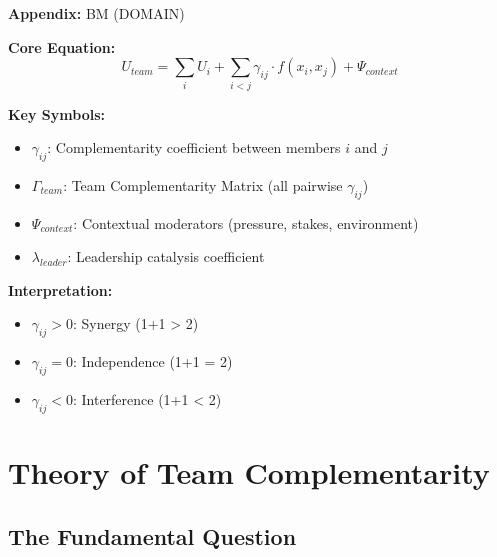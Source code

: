 
\begin{tcolorbox}[colback=blue!5!white, colframe=blue!75!black, title=Quick Reference: Team Complementarity]
\textbf{Appendix:} BM (DOMAIN)


\textbf{Core Equation:}
\begin{equation}
U_{team} = \sum_{i} U_i + \sum_{i<j} \gamma_{ij} \cdot f(x_i, x_j) + \Psi_{context}
\end{equation}

\textbf{Key Symbols:}
\begin{itemize}
    \item $\gamma_{ij}$: Complementarity coefficient between members $i$ and $j$
    \item $\Gamma_{team}$: Team Complementarity Matrix (all pairwise $\gamma_{ij}$)
    \item $\Psi_{context}$: Contextual moderators (pressure, stakes, environment)
    \item $\lambda_{leader}$: Leadership catalysis coefficient
\end{itemize}

\textbf{Interpretation:}
\begin{itemize}
    \item $\gamma_{ij} > 0$: Synergy (1+1 > 2)
    \item $\gamma_{ij} = 0$: Independence (1+1 = 2)
    \item $\gamma_{ij} < 0$: Interference (1+1 < 2)
\end{itemize}

\end{tcolorbox}


\section{Theory of Team Complementarity}
\label{sec:bm-theory}

\subsection{The Fundamental Question}


